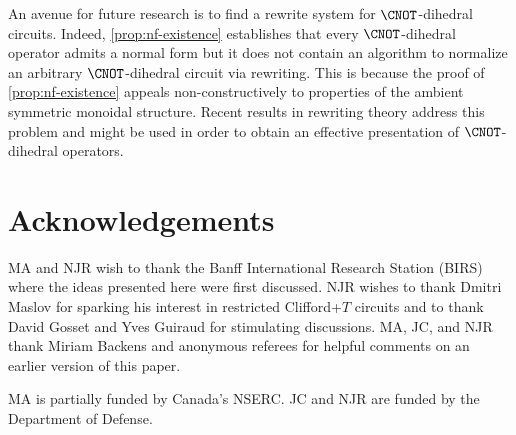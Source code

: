 \documentclass{eptcs}
\begin{document}
An avenue for future research is to find a rewrite system for
$\CNOT$-dihedral circuits. Indeed, \cref{prop:nf-existence}
establishes that every $\CNOT$-dihedral operator admits a normal form
but it does not contain an algorithm to normalize an arbitrary
$\CNOT$-dihedral circuit via rewriting. This is because the proof of
\cref{prop:nf-existence} appeals non-constructively to properties of
the ambient symmetric monoidal structure. Recent results in rewriting
theory address this problem \cite{BGKSZ} and might be used in order to
obtain an effective presentation of $\CNOT$-dihedral operators.

\section{Acknowledgements}
\label{sec:acknowledgements}

MA and NJR wish to thank the Banff International Research Station
(BIRS) where the ideas presented here were first discussed. NJR wishes
to thank Dmitri Maslov for sparking his interest in restricted
Clifford+$T$ circuits and to thank David Gosset and Yves Guiraud for
stimulating discussions. MA, JC, and NJR thank Miriam Backens and
anonymous referees for helpful comments on an earlier version of this
paper.

MA is partially funded by Canada's NSERC. JC and NJR are funded by the
Department of Defense.

 
\end{document}
